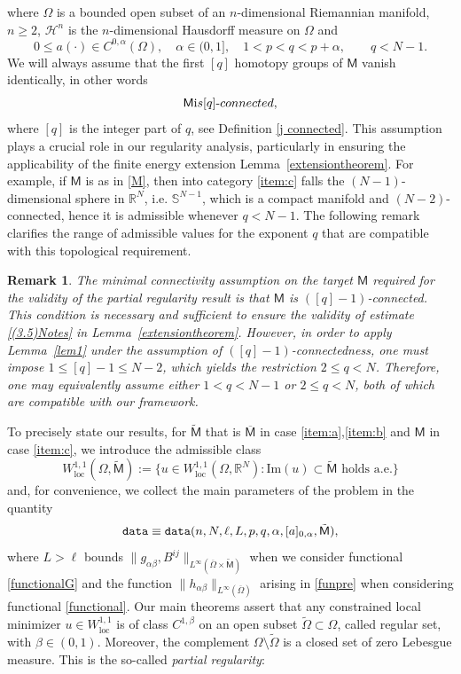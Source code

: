 \documentclass[a4paper]{amsart}
\def\loc{\operatorname{loc}}
\newtheorem{remark}{Remark}[section]
\theoremstyle{plain}  %
\numberwithin{equation}{section}
\newcommand{\R}{\mathbb{R}}
\newcommand{\mm}{\mathsf{M}}
\newcommand{\tx}[1]{\textnormal{\texttt{#1}}}
\def\loc{\operatorname{loc}}
\def\eqn#1$$#2$${\begin{equation}\label#1#2\end{equation}}
\begin{document}
where $\Omega$ is a bounded open subset of an $n$-dimensional Riemannian manifold, \(n\ge 2\), $\mathscr{H}^n$ is the $n$-dimensional Hausdorff measure on $\Omega$ and 
\begin{equation}\label{pq}
0\leq a(\cdot) \in  C^{0,\alpha}(\Omega), \quad \alpha \in (0,1], \quad 1 < p < q < p + \alpha, \qquad q < N-1.
\end{equation}
We will always assume that the first $[q]$ homotopy groups of $\mm$ vanish identically, in other words
 \eqn{M}
 $$ \mm \text{ is } [q]\text{-connected},$$
 where $[q]$ is the integer part of $q$, see Definition \ref{j connected}.  This assumption plays a crucial role in our regularity analysis, particularly in ensuring the applicability of the finite energy extension Lemma~\ref{extensiontheorem}. For example, if $\mm$ is as in \eqref{M}, then  into category \ref{item:c} falls  the $(N-1)$-dimensional sphere in $\R^N$, i.e. \(\mathbb{S}^{N-1}\),  which is a compact manifold and \((N-2)\)-connected, hence it is admissible whenever \(q < N-1\).
  The following remark clarifies the range of admissible values for the exponent \( q \) that are compatible with this topological requirement.
\begin{remark}
\normalfont
The minimal connectivity assumption on the target \( \mm  \) required for the validity of the partial regularity result is that \( \mm \) is \(([q]-1)\)-connected. This condition is necessary and sufficient to ensure the validity of estimate \eqref{(3.5)Notes} in Lemma~\ref{extensiontheorem}. However, in order to apply Lemma~\ref{lem1} under the assumption of \(([q]-1)\)-connectedness, one must impose \( 1 \leq [q]-1 \leq N-2 \), which yields the restriction \( 2 \leq q < N \). Therefore, one may equivalently assume either \( 1 < q < N - 1 \) or \( 2 \leq q < N \), both of which are compatible with our framework.
\end{remark}
\noindent
 To precisely state our results, for $ \tilde{\mm}$ that is   
    $\overline{\mm}$ in case \ref{item:a},\ref{item:b} and $\mm$ in case \ref{item:c}, we introduce the admissible class
$$ W^{1,1}_{\loc}(\Omega, \tilde{\mm}) := \{u \in W^{1,1}_{\loc}(\Omega, \R^N):  \text{Im}(u) \subset \tilde{\mm} \text{ holds a.e.}\}$$
and, for convenience, we collect the main parameters of the problem in the quantity
$$ \tx{data} \equiv \tx{data}(n,N,\ell,L,p,q,\alpha,[a]_{0,\alpha},\tilde{\mm}),$$
where $L > \ell$ bounds $\|g_{\alpha\beta},B^{ij}\|_{L^\infty(\overline{\Omega}\times \tilde{\mm})}$ when we consider functional \eqref{functionalG} and the function $\|h_{\alpha\beta}\|_{L^\infty(\overline{\Omega})}$ arising in \eqref{funpre} when considering functional \eqref{functional}. Our main theorems assert that any constrained local minimizer \(u \in W^{1,1}_{\loc}\) is of class \(C^{1,\beta}\) on an open subset \(\tilde{\Omega} \subset \Omega\), called regular set, with \(\beta \in (0,1)\). Moreover, the complement \(\Omega \setminus \tilde{\Omega}\) is a closed set of zero Lebesgue measure. This is the so-called {\em partial regularity}: 
\end{document}

